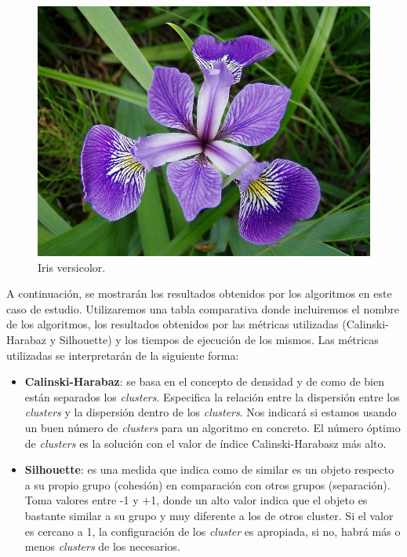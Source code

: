 \documentclass[a4paper, 20pt]{article}
\begin{document}
{\begin{figure}[h]
  \begin{minipage}[h]{0.31\textwidth}
    \includegraphics[width=\textwidth]{dani/versicolor.jpg}
    \caption{Iris versicolor.}
  \end{minipage}
\end{figure}

A continuación, se mostrarán los resultados obtenidos por los algoritmos en este caso de estudio. Utilizaremos una tabla comparativa donde incluiremos el nombre de los algoritmos, los resultados obtenidos por las métricas utilizadas (Calinski-Harabaz y Silhouette) y los tiempos de ejecución de los mismos. Las métricas utilizadas se interpretarán de la siguiente forma:

\begin{itemize}
\item \textbf{Calinski-Harabaz}: se basa en el concepto de densidad y de como de bien están separados los \textit{clusters}. Especifica la relación entre la dispersión entre los \textit{clusters} y la dispersión dentro de los \textit{clusters}. Nos indicará si estamos usando un buen número de \textit{clusters} para un algoritmo en concreto. El número óptimo de \textit{clusters} es la solución con el valor de índice Calinski-Harabasz más alto.
\item \textbf{Silhouette}: es una medida que indica como de similar es un objeto respecto a su propio grupo (cohesión) en comparación con otros grupos (separación). Toma valores entre -1 y +1, donde un alto valor indica que el objeto es bastante similar a su grupo y muy diferente a los de otros cluster. Si el valor es cercano a 1, la configuración de los \textit{cluster} es apropiada, si no, habrá más o menos \textit{clusters} de los necesarios.
\end{itemize}

}
\end{document}

